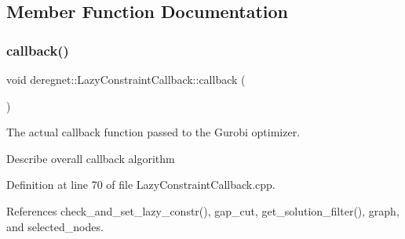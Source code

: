 \subsection{Member Function Documentation}
\mbox{\label{classderegnet_1_1LazyConstraintCallback_ae6cde79cca11b944d25f1533727fd85b}} 
\subsubsection{\texorpdfstring{callback()}{callback()}}
{\footnotesize\ttfamily void deregnet\+::\+Lazy\+Constraint\+Callback\+::callback (\begin{DoxyParamCaption}{ }\end{DoxyParamCaption})\hspace{0.3cm}{\ttfamily [protected]}}



The actual callback function passed to the Gurobi optimizer. 

Describe overall callback algorithm 

Definition at line 70 of file Lazy\+Constraint\+Callback.\+cpp.



References check\+\_\+and\+\_\+set\+\_\+lazy\+\_\+constr(), gap\+\_\+cut, get\+\_\+solution\+\_\+filter(), graph, and selected\+\_\+nodes.


